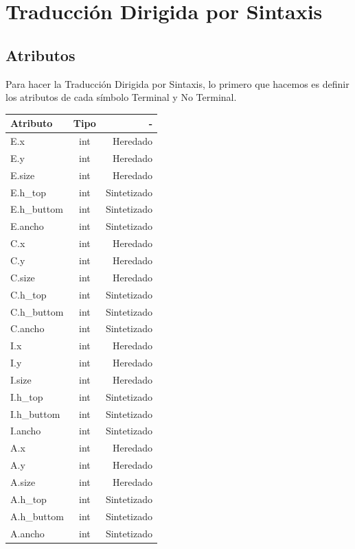 \section{Traducci\'on Dirigida por Sintaxis}
\subsection{Atributos}
Para hacer la Traducci\'on Dirigida por Sintaxis, lo primero que hacemos es 
definir los atributos de cada s\'imbolo Terminal y No Terminal.

\begin{center}
  \begin{tabular}{| l | c | r |}
    \hline
    Atributo & Tipo & - \\ \hline
    E.x & int & Heredado \\ \hline
    E.y & int & Heredado \\ \hline
    E.size & int & Heredado \\ \hline
    E.h\_top & int & Sintetizado \\ \hline
    E.h\_buttom & int & Sintetizado \\ \hline
    E.ancho & int & Sintetizado \\ \hline
    
    C.x & int & Heredado \\ \hline
    C.y & int & Heredado \\ \hline
    C.size & int & Heredado \\ \hline
    C.h\_top & int & Sintetizado \\ \hline
    C.h\_buttom & int & Sintetizado \\ \hline
    C.ancho & int & Sintetizado \\ \hline
    
    I.x & int & Heredado \\ \hline
    I.y & int & Heredado \\ \hline
    I.size & int & Heredado \\ \hline
    I.h\_top & int & Sintetizado \\ \hline
    I.h\_buttom & int & Sintetizado \\ \hline
    I.ancho & int & Sintetizado \\ \hline
    
    A.x & int & Heredado \\ \hline
    A.y & int & Heredado \\ \hline
    A.size & int & Heredado \\ \hline
    A.h\_top & int & Sintetizado \\ \hline
    A.h\_buttom & int & Sintetizado \\ \hline
    A.ancho & int & Sintetizado \\ \hline
  \end{tabular}
\end{center}
  

